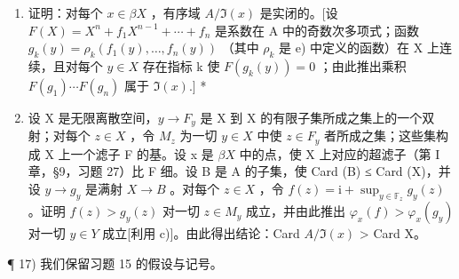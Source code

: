\begin{enumerate}
\def\labelenumi{\alph{enumi})}
\setcounter{enumi}{5}
\item
  证明：对每个 \(x \in \beta X\) ，有序域 \(A/\Im(x)\) 是实闭的。{[}设 \(F(X) = X^{n} + f_{1}X^{n-1} + \cdots + f_{n}\) 是系数在 A 中的奇数次多项式；函数 \(g_{k}(y) = \rho_{k}(f_{1}(y), \ldots, f_{n}(y))\) （其中 \(\rho_{k}\) 是 e) 中定义的函数）在 X 上连续，且对每个 \(y \in X\) 存在指标 k 使 \(F(g_{k}(y)) = 0\) ；由此推出乘积 \(F(g_{1}) \cdots F(g_{n})\) 属于 \(\Im(x).]\) *
\item
  设 X 是无限离散空间，\(y \to F_y\) 是 X 到 X 的有限子集所成之集上的一个双射；对每个 \(z \in X\) ，令 \(M_z\) 为一切 \(y \in X\) 中使 \(z \in F_y\) 者所成之集；这些集构成 X 上一个滤子 F 的基。设 x 是 \(\beta X\) 中的点，使 X 上对应的超滤子（第 I 章，§9，习题 27）比 F 细。设 B 是 A 的子集，使 Card (B) ≤ Card (X)，并设 \(y \to g_y\) 是满射 \(X \to B\) 。对每个 \(z \in X\) ，令 \(f(z) = \mathrm{i} + \sup_{y \in \mathbb{F}_z} g_y(z)\) 。证明 \(f(z) > g_y(z)\) 对一切 \(z \in M_y\) 成立，并由此推出 \(\varphi_x(f) > \varphi_x(g_y)\) 对一切 \(y \in Y\) 成立{[}利用 c){]}。由此得出结论：Card \(A/\Im(x)\) \textgreater{} Card X。
\end{enumerate}

¶ 17) 我们保留习题 15 的假设与记号。

